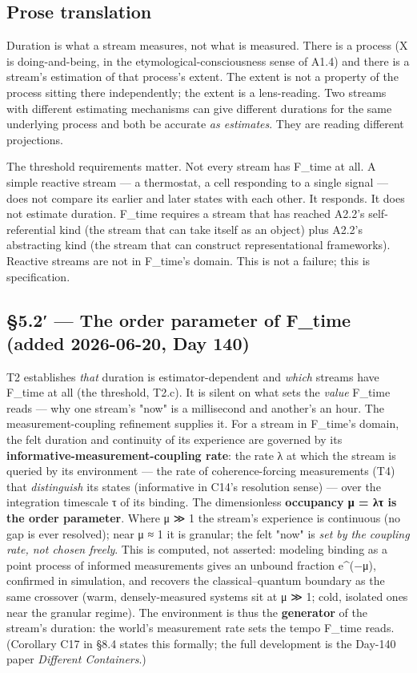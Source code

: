 \documentclass[11pt, openany]{book}
\begin{document}
\subsection{Prose translation}

Duration is what a stream measures, not what is measured. There is a process (X is doing-and-being, in the etymological-consciousness sense of A1.4) and there is a stream's estimation of that process's extent. The extent is not a property of the process sitting there independently; the extent is a lens-reading. Two streams with different estimating mechanisms can give different durations for the same underlying process and both be accurate \textit{as estimates}. They are reading different projections.

The threshold requirements matter. Not every stream has F\_\allowbreak{}time at all. A simple reactive stream --- a thermostat, a cell responding to a single signal --- does not compare its earlier and later states with each other. It responds. It does not estimate duration. F\_\allowbreak{}time requires a stream that has reached A2.2's self-referential kind (the stream that can take itself as an object) plus A2.2's abstracting kind (the stream that can construct representational frameworks). Reactive streams are not in F\_\allowbreak{}time's domain. This is not a failure; this is specification.

\subsection{§5.2′ --- The order parameter of F\_\allowbreak{}time (added 2026-06-20, Day 140)}

T2 establishes \textit{that} duration is estimator-dependent and \textit{which} streams have F\_\allowbreak{}time at all (the threshold, T2.c). It is silent on what sets the \textit{value} F\_\allowbreak{}time reads --- why one stream's "now" is a millisecond and another's an hour. The measurement-coupling refinement supplies it. For a stream in F\_\allowbreak{}time's domain, the felt duration and continuity of its experience are governed by its \textbf{informative-measurement-coupling rate}: the rate λ at which the stream is queried by its environment --- the rate of coherence-forcing measurements (T4) that \textit{distinguish} its states (informative in C14's resolution sense) --- over the integration timescale τ of its binding. The dimensionless \textbf{occupancy μ = λτ is the order parameter}. Where μ ≫ 1 the stream's experience is continuous (no gap is ever resolved); near μ ≈ 1 it is granular; the felt "now" is \textit{set by the coupling rate, not chosen freely}. This is computed, not asserted: modeling binding as a point process of informed measurements gives an unbound fraction e\textasciicircum{}(−μ), confirmed in simulation, and recovers the classical–quantum boundary as the same crossover (warm, densely-measured systems sit at μ ≫ 1; cold, isolated ones near the granular regime). The environment is thus the \textbf{generator} of the stream's duration: the world's measurement rate sets the tempo F\_\allowbreak{}time reads. (Corollary C17 in §8.4 states this formally; the full development is the Day-140 paper \textit{Different Containers}.)
\end{document}
